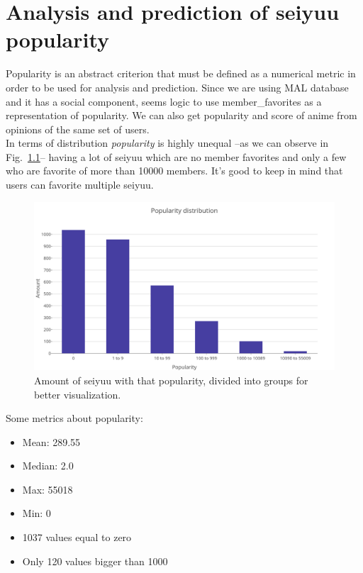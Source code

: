 \chapter{Analysis and prediction of seiyuu popularity}

Popularity is an abstract criterion that must be defined as a numerical metric in order to be used for analysis and prediction. Since we are using MAL database and it has a social component, seems logic to use member\_favorites as a representation of popularity. We can also get popularity and score of anime from opinions of the same set of users.\\

In terms of distribution \textit{popularity} is highly unequal \---as we can observe in Fig.~\ref{fig:popularityDistribution}\--- having a lot of seiyuu which are no member favorites and only a few who are favorite of more than 10000 members. It's good to keep in mind that users can favorite multiple seiyuu.

\begin{figure}[!h]
	\begin{center}
	\includegraphics[width=\columnwidth]{graphics/popularityDistribution.png}
	\caption{Amount of seiyuu with that popularity, divided into groups for better visualization.}
	\label{fig:popularityDistribution}
	\end{center}
\end{figure}

\newpage

Some metrics about popularity:
\begin{itemize}
	\item Mean:    289.55
	\item Median:    2.0
	\item Max:    55018
	\item Min:    0 
	\item 1037 values equal to zero
	\item Only 120 values bigger than 1000
\end{itemize}

